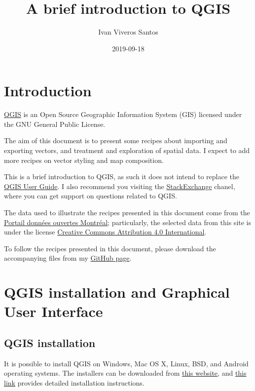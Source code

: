 \documentclass[]{book}
\title{A brief introduction to QGIS}
\author{Ivan Viveros Santos}
\date{2019-09-18}
\theoremstyle{definition}
\theoremstyle{definition}
\theoremstyle{definition}
\theoremstyle{remark}
\begin{document}
\maketitle

{
\setcounter{tocdepth}{1}
\tableofcontents
}
\chapter{Introduction}\label{introduction}

\href{https://qgis.org/en/site/}{QGIS} is an Open Source Geographic
Information System (GIS) licensed under the GNU General Public License.

The aim of this document is to present some recipes about importing and
exporting vectors, and treatment and exploration of spatial data. I
expect to add more recipes on vector styling and map composition.

This is a brief introduction to QGIS, as such it does not intend to
replace the \href{https://docs.qgis.org/3.4/en/docs/user_manual/}{QGIS
User Guide}. I also recommend you visiting the
\href{https://gis.stackexchange.com/}{StackExchange} chanel, where you
can get support on questions related to QGIS.

The data used to illustrate the recipes presented in this document come
from the \href{http://donnees.ville.montreal.qc.ca/}{Portail données
ouvertes Montréal}; particularly, the selected data from this site is
under the license
\href{https://creativecommons.org/licenses/by/4.0/}{Creative Commons
Attribution 4.0 International}.

To follow the recipes presented in this document, please download the
accompanying files from my
\href{https://github.com/iviveros/QGIS_Data}{GitHub page}.

\chapter{QGIS installation and Graphical User
Interface}\label{installation}

\section{QGIS installation}\label{qgis-installation}

It is possible to install QGIS on Windows, Mac OS X, Linux, BSD, and
Android operating systems. The installers can be downloaded from
\href{https://qgis.org/en/site/forusers/download.html}{this website},
and \href{https://qgis.org/en/site/forusers/alldownloads.html\#}{this
link} provides detailed installation instructions.
\end{document}
